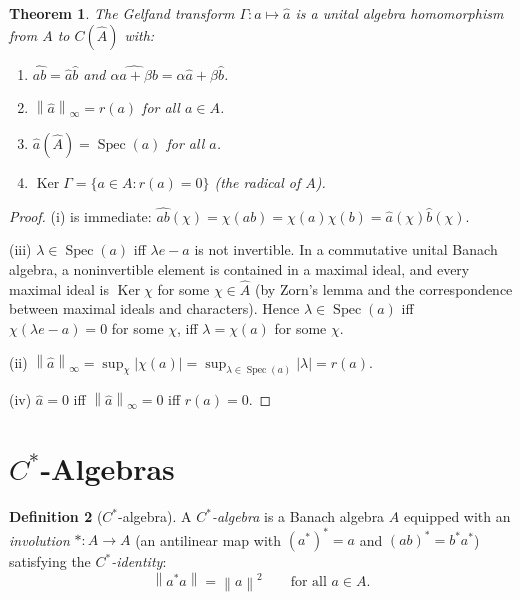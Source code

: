 \documentclass[a4paper,12pt]{book}
\DeclareMathOperator{\Ker}{Ker}
\DeclareMathOperator{\Spec}{Spec}
\newcommand{\norm}[1]{\left\| #1 \right\|}
\newcommand{\abs}[1]{\left| #1 \right|}
\theoremstyle{definition}
\newtheorem{definition}{Definition}[chapter]
\theoremstyle{plain}
\newtheorem{theorem}[definition]{Theorem}
\theoremstyle{remark}
\begin{document}
\begin{theorem}\label{thm:gelfand-transform}
The Gelfand transform $\Gamma \colon a \mapsto \hat{a}$ is a unital algebra
homomorphism from $A$ to $C(\hat{A})$ with:
\begin{enumerate}[label=(\roman*)]
  \item $\widehat{ab} = \hat{a}\hat{b}$ and $\widehat{\alpha a + \beta b} = \alpha\hat{a} + \beta\hat{b}$.
  \item $\norm{\hat{a}}_\infty = r(a)$ for all $a \in A$.
  \item $\hat{a}(\hat{A}) = \Spec(a)$ for all $a$.
  \item $\Ker\Gamma = \{a \in A : r(a) = 0\}$ (the \emph{radical} of $A$).
\end{enumerate}
\end{theorem}

\begin{proof}
(i) is immediate: $\widehat{ab}(\chi) = \chi(ab) = \chi(a)\chi(b) = \hat{a}(\chi)\hat{b}(\chi)$.

(iii) $\lambda \in \Spec(a)$ iff $\lambda e - a$ is not invertible. In a commutative
unital Banach algebra, a noninvertible element is contained in a maximal ideal,
and every maximal ideal is $\Ker\chi$ for some $\chi \in \hat{A}$ (by Zorn's lemma
and the correspondence between maximal ideals and characters). Hence
$\lambda \in \Spec(a)$ iff $\chi(\lambda e - a) = 0$ for some $\chi$, iff
$\lambda = \chi(a)$ for some $\chi$.

(ii) $\norm{\hat{a}}_\infty = \sup_\chi \abs{\chi(a)} = \sup_{\lambda \in \Spec(a)} \abs{\lambda} = r(a)$.

(iv) $\hat{a} = 0$ iff $\norm{\hat{a}}_\infty = 0$ iff $r(a) = 0$.
\end{proof}


\section{$C^*$-Algebras}\label{sec:cstar-def}


\begin{definition}[$C^*$-algebra]\label{def:cstar-algebra}
A \emph{$C^*$-algebra} is a Banach algebra $A$ equipped with an
\emph{involution} $* \colon A \to A$ (an antilinear map with
$(a^*)^* = a$ and $(ab)^* = b^*a^*$) satisfying the \emph{$C^*$-identity}:
\[
  \norm{a^*a} = \norm{a}^2 \qquad \text{for all } a \in A.
\]
\end{definition}
\end{document}
